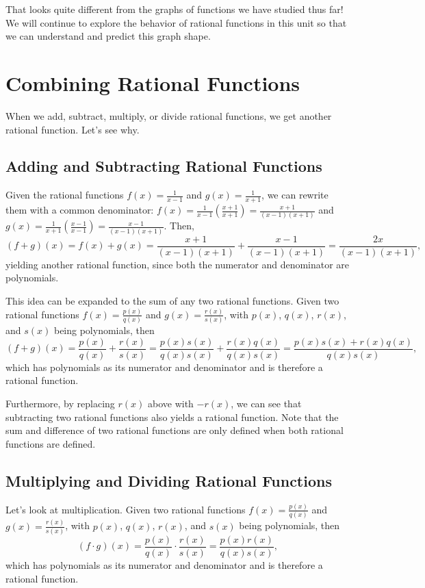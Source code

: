 \documentclass{ximera}
\begin{document}
\begin{example}
\begin{explanation}
That looks quite different from the graphs of functions we have studied thus far!  We will continue to explore the behavior of rational functions in this unit so that we can understand and predict this graph shape.
\end{explanation}
\end{example}

\section{Combining Rational Functions}

When we add, subtract, multiply, or divide rational functions, we get another rational function. Let's see why.

\subsection{Adding and Subtracting Rational Functions}
Given the rational functions $f(x) = \frac{1}{x - 1}$ and $g(x) = \frac{1}{x + 1}$, we can rewrite them with a common denominator: $f(x) = \frac{1}{x - 1} \left(\frac{x + 1}{x + 1}\right) = \frac{x + 1}{(x - 1)(x + 1)}$ and $g(x) = \frac{1}{x +1} \left(\frac{x - 1}{x - 1}\right) = \frac{x - 1}{(x - 1)(x + 1)}$. Then,
$$
(f + g)(x) = f(x) + g(x) = \frac{x + 1}{(x - 1)(x + 1)} + \frac{x - 1}{(x - 1)(x + 1)} = \frac{2x}{(x - 1)(x + 1)},
$$
yielding another rational function, since both the numerator and denominator are polynomials. 

This idea can be expanded to the sum of any two rational functions. Given two rational functions $f(x) = \frac{p(x)}{q(x)}$ and $g(x) = \frac{r(x)}{s(x)}$, with $p(x)$, $q(x)$, $r(x)$, and $s(x)$ being polynomials, then 
$$
(f + g)(x) = \frac{p(x)}{q(x)} + \frac{r(x)}{s(x)} = \frac{p(x)s(x)}{q(x)s(x)} + \frac{r(x)q(x)}{q(x)s(x)} = \frac{p(x)s(x) + r(x)q(x)}{q(x)s(x)}, 
$$
which has polynomials as its numerator and denominator and is therefore a rational function. 

Furthermore, by replacing $r(x)$ above with $-r(x)$, we can see that subtracting two rational functions also yields a rational function. Note that the sum and difference of two rational functions are only defined when both rational functions are defined. 

\subsection{Multiplying and Dividing Rational Functions}
Let's look at multiplication. Given two rational functions $f(x) = \frac{p(x)}{q(x)}$ and $g(x) = \frac{r(x)}{s(x)}$, with $p(x)$, $q(x)$, $r(x)$, and $s(x)$ being polynomials, then 
$$
(f \cdot g)(x) = \frac{p(x)}{q(x)} \cdot \frac{r(x)}{s(x)} =  \frac{p(x)r(x)}{q(x)s(x)}, 
$$
which has polynomials as its numerator and denominator and is therefore a rational function. 
\end{document}

